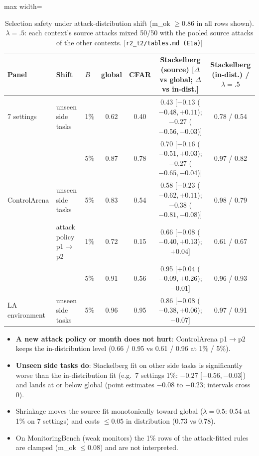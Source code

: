 \documentclass[11pt]{article}
\newcommand{\src}[1]{{\footnotesize\textcolor{ink2}{[\nolinkurl{#1}]}}}
\begin{document}
\begin{table}[!htb]\centering\small
\begin{adjustbox}{max width=\linewidth}\begin{tabular}{@{}lllcccc@{}}
\toprule
Panel & Shift & $B$ & global & CFAR & Stackelberg (source) [$\Delta$ vs global; $\Delta$ vs in-dist.] & Stackelberg (in-dist.) / $\lambda=.5$\\
\midrule
7 settings & unseen side tasks & 1\% & 0.62 & 0.40 & 0.43 [$-0.13$ ($-0.48,+0.11$); $-0.27$ ($-0.56,-0.03$)] & 0.78 / 0.54\\
& & 5\% & 0.87 & 0.78 & 0.70 [$-0.16$ ($-0.51,+0.03$); $-0.27$ ($-0.65,-0.04$)] & 0.97 / 0.82\\
ControlArena & unseen side tasks & 5\% & 0.83 & 0.54 & 0.58 [$-0.23$ ($-0.62,+0.11$); $-0.38$ ($-0.81,-0.08$)] & 0.98 / 0.79\\
& attack policy p1$\to$p2 & 1\% & 0.72 & 0.15 & 0.66 [$-0.08$ ($-0.40,+0.13$); $+0.04$] & 0.61 / 0.67\\
& & 5\% & 0.91 & 0.56 & 0.95 [$+0.04$ ($-0.09,+0.26$); $-0.01$] & 0.96 / 0.93\\
LA environment & unseen side tasks & 5\% & 0.96 & 0.95 & 0.86 [$-0.08$ ($-0.38,+0.06$); $-0.07$] & 0.97 / 0.91\\
\bottomrule
\end{tabular}\end{adjustbox}
\caption{Selection safety under attack-distribution shift (m\_ok $\ge0.86$ in all rows shown). $\lambda=.5$: each context's source attacks mixed 50/50 with the pooled source attacks of the other contexts. \src{r2_t2/tables.md (E1a)}}
\end{table}
\begin{itemize}
\item \textbf{A new attack policy or month does not hurt}: ControlArena p1$\to$p2 keeps the in-distribution level (0.66 / 0.95 vs 0.61 / 0.96 at 1\% / 5\%).
\item \textbf{Unseen side tasks do}: Stackelberg fit on other side tasks is significantly worse than the in-distribution fit (e.g.\ 7 settings 1\%: $-0.27$ [$-0.56,-0.03$]) and lands at or below global (point estimates $-0.08$ to $-0.23$; intervals cross 0).
\item Shrinkage moves the source fit monotonically toward global ($\lambda=0.5$: 0.54 at 1\% on 7 settings) and costs $\le0.05$ in distribution (0.73 vs 0.78).
\item On MonitoringBench (weak monitors) the 1\% rows of the attack-fitted rules are clamped (m\_ok $\le0.08$) and are not interpreted.
\end{itemize}
\end{document}
